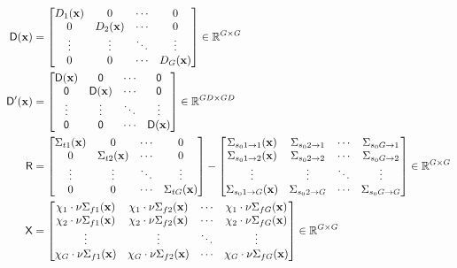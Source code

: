 \documentclass[
  12pt,
  a4paper,
  table]{scrbook}
\theoremstyle{plain}
\theoremstyle{definition}
\theoremstyle{plain}
\theoremstyle{plain}
\theoremstyle{remark}
\begin{document}
\[
\begin{aligned}
\mathsf{D}(\mathbf{x}) &=
\begin{bmatrix}
D_1(\mathbf{x}) & 0 & \cdots & 0 \\
0 & D_2(\mathbf{x}) & \cdots & 0 \\
\vdots & \vdots & \ddots & \vdots \\
0 & 0 & \cdots & D_G(\mathbf{x})
\end{bmatrix} \in \mathbb{R}^{G \times G}
\\
\mathsf{D}^{\prime}(\mathbf{x}) &=
\begin{bmatrix}
\mathsf{D}(\mathbf{x}) & \mathsf{0} & \cdots & \mathsf{0} \\
\mathsf{0} & \mathsf{D}(\mathbf{x}) & \cdots & \mathsf{0} \\
\vdots & \vdots & \ddots & \vdots \\
\mathsf{0} & \mathsf{0} & \cdots & \mathsf{D}(\mathbf{x})
\end{bmatrix} \in \mathbb{R}^{GD \times GD}
\\
\mathsf{R} &=
\begin{bmatrix}
\Sigma_{t1}(\mathbf{x}) & 0 & \cdots & 0 \\
0 & \Sigma_{t2}(\mathbf{x}) & \cdots & 0 \\
\vdots & \vdots & \ddots & \vdots \\
0 & 0 & \cdots & \Sigma_{tG}(\mathbf{x})
\end{bmatrix}
-
\begin{bmatrix}
\Sigma_{s_0 1 \rightarrow 1}(\mathbf{x}) & \Sigma_{s_0 2 \rightarrow 1} & \cdots & \Sigma_{s_0 G \rightarrow 1} \\
\Sigma_{s_0 1 \rightarrow 2}(\mathbf{x}) & \Sigma_{s_0 2 \rightarrow 2} & \cdots & \Sigma_{s_0 G \rightarrow 2} \\
\vdots & \vdots & \ddots & \vdots \\
\Sigma_{s_0 1 \rightarrow G}(\mathbf{x}) & \Sigma_{s_0 2 \rightarrow G} & \cdots & \Sigma_{s_0 G \rightarrow G} \\
\end{bmatrix} \in \mathbb{R}^{G \times G}
\\
\mathsf{X} &=
\begin{bmatrix}
\chi_1 \cdot \nu\Sigma_{f1}(\mathbf{x}) & \chi_1 \cdot \nu\Sigma_{f2}(\mathbf{x}) & \cdots & \chi_1 \cdot \nu\Sigma_{fG}(\mathbf{x}) \\
\chi_2 \cdot \nu\Sigma_{f1}(\mathbf{x}) & \chi_2 \cdot \nu\Sigma_{f2}(\mathbf{x}) & \cdots & \chi_2 \cdot \nu\Sigma_{fG}(\mathbf{x}) \\
\vdots & \vdots & \ddots & \vdots \\
\chi_G \cdot \nu\Sigma_{f1}(\mathbf{x}) & \chi_G \cdot \nu\Sigma_{f2}(\mathbf{x}) & \cdots & \chi_G \cdot \nu\Sigma_{fG}(\mathbf{x}) \\
\end{bmatrix} \in \mathbb{R}^{G \times G}
\end{aligned}
\]
\end{document}
